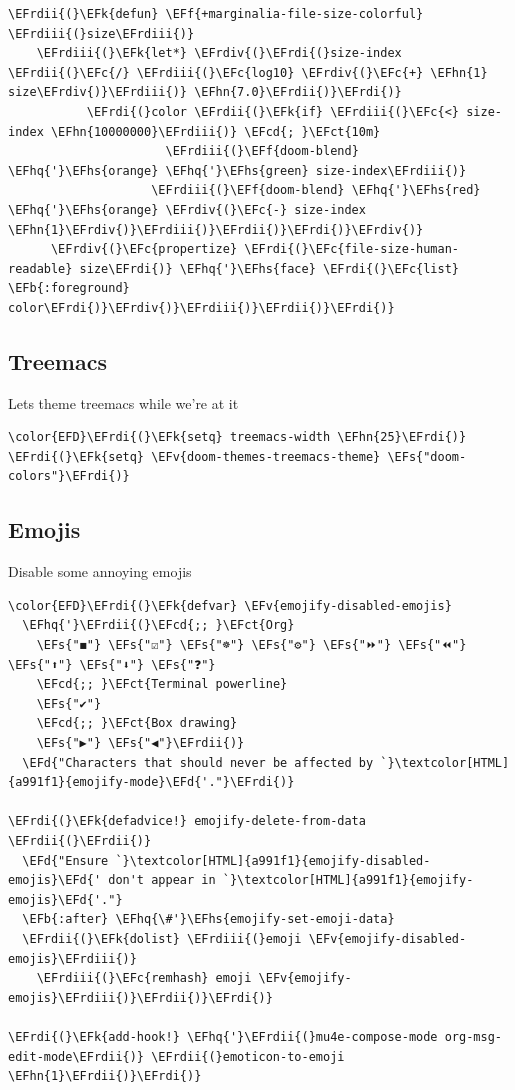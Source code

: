 \documentclass{scrartcl}
\newcommand{\EFk}[1]{\textcolor{EFk}{#1}} %
\newcommand{\EFd}[1]{\textcolor{EFd}{#1}} %
\newcommand{\EFs}[1]{\textcolor{EFs}{#1}} %
\newcommand{\EFb}[1]{\textcolor{EFb}{#1}} %
\newcommand{\EFct}[1]{\textcolor{EFct}{#1}} %
\newcommand{\EFc}[1]{\textcolor{EFc}{#1}} %
\newcommand{\EFv}[1]{\textcolor{EFv}{#1}} %
\newcommand{\EFf}[1]{\textcolor{EFf}{#1}} %
\newcommand{\EFcd}[1]{\textcolor{EFcd}{#1}} %
\newcommand{\EFhn}[1]{#1} %
\newcommand{\EFhq}[1]{#1} %
\newcommand{\EFhs}[1]{#1} %
\newcommand{\EFrdi}[1]{#1} %
\newcommand{\EFrdii}[1]{#1} %
\newcommand{\EFrdiii}[1]{#1} %
\newcommand{\EFrdiv}[1]{#1} %
\begin{document}
\begin{Code}
\begin{Verbatim}[]
  \EFrdii{(}\EFk{defun} \EFf{+marginalia-file-size-colorful} \EFrdiii{(}size\EFrdiii{)}
    \EFrdiii{(}\EFk{let*} \EFrdiv{(}\EFrdi{(}size-index \EFrdii{(}\EFc{/} \EFrdiii{(}\EFc{log10} \EFrdiv{(}\EFc{+} \EFhn{1} size\EFrdiv{)}\EFrdiii{)} \EFhn{7.0}\EFrdii{)}\EFrdi{)}
           \EFrdi{(}color \EFrdii{(}\EFk{if} \EFrdiii{(}\EFc{<} size-index \EFhn{10000000}\EFrdiii{)} \EFcd{; }\EFct{10m}
                      \EFrdiii{(}\EFf{doom-blend} \EFhq{'}\EFhs{orange} \EFhq{'}\EFhs{green} size-index\EFrdiii{)}
                    \EFrdiii{(}\EFf{doom-blend} \EFhq{'}\EFhs{red} \EFhq{'}\EFhs{orange} \EFrdiv{(}\EFc{-} size-index \EFhn{1}\EFrdiv{)}\EFrdiii{)}\EFrdii{)}\EFrdi{)}\EFrdiv{)}
      \EFrdiv{(}\EFc{propertize} \EFrdi{(}\EFc{file-size-human-readable} size\EFrdi{)} \EFhq{'}\EFhs{face} \EFrdi{(}\EFc{list} \EFb{:foreground} color\EFrdi{)}\EFrdiv{)}\EFrdiii{)}\EFrdii{)}\EFrdi{)}
\end{Verbatim}
\end{Code}

\subsection{Treemacs}
\label{sec:org19c4020}
Lets theme treemacs while we're at it
\begin{Code}
\begin{Verbatim}[]
\color{EFD}\EFrdi{(}\EFk{setq} treemacs-width \EFhn{25}\EFrdi{)}
\EFrdi{(}\EFk{setq} \EFv{doom-themes-treemacs-theme} \EFs{"doom-colors"}\EFrdi{)}
\end{Verbatim}
\end{Code}

\subsection{Emojis}
\label{sec:orgb9b5bd2}
Disable some annoying emojis
\begin{Code}
\begin{Verbatim}[]
\color{EFD}\EFrdi{(}\EFk{defvar} \EFv{emojify-disabled-emojis}
  \EFhq{'}\EFrdii{(}\EFcd{;; }\EFct{Org}
    \EFs{"◼"} \EFs{"☑"} \EFs{"☸"} \EFs{"⚙"} \EFs{"⏩"} \EFs{"⏪"} \EFs{"⬆"} \EFs{"⬇"} \EFs{"❓"}
    \EFcd{;; }\EFct{Terminal powerline}
    \EFs{"✔"}
    \EFcd{;; }\EFct{Box drawing}
    \EFs{"▶"} \EFs{"◀"}\EFrdii{)}
  \EFd{"Characters that should never be affected by `}\textcolor[HTML]{a991f1}{emojify-mode}\EFd{'."}\EFrdi{)}

\EFrdi{(}\EFk{defadvice!} emojify-delete-from-data \EFrdii{(}\EFrdii{)}
  \EFd{"Ensure `}\textcolor[HTML]{a991f1}{emojify-disabled-emojis}\EFd{' don't appear in `}\textcolor[HTML]{a991f1}{emojify-emojis}\EFd{'."}
  \EFb{:after} \EFhq{\#'}\EFhs{emojify-set-emoji-data}
  \EFrdii{(}\EFk{dolist} \EFrdiii{(}emoji \EFv{emojify-disabled-emojis}\EFrdiii{)}
    \EFrdiii{(}\EFc{remhash} emoji \EFv{emojify-emojis}\EFrdiii{)}\EFrdii{)}\EFrdi{)}

\EFrdi{(}\EFk{add-hook!} \EFhq{'}\EFrdii{(}mu4e-compose-mode org-msg-edit-mode\EFrdii{)} \EFrdii{(}emoticon-to-emoji \EFhn{1}\EFrdii{)}\EFrdi{)}
\end{Verbatim}
\end{Code}
\end{document}
